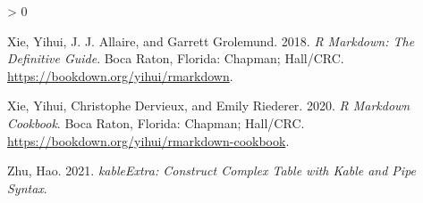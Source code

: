 \documentclass[fleqn,10pt]{wlpeerj} %
\newlength{\cslhangindent}
\newenvironment{CSLReferences}[2] %
 {%
  \setlength{\parindent}{0pt}
  \ifodd #1 \everypar{\setlength{\hangindent}{\cslhangindent}}\ignorespaces\fi
  \ifnum #2 > 0
  \setlength{\parskip}{#2\baselineskip}
  \fi
 }%
 {}
\begin{document}
\begin{CSLReferences}{1}{0}
\leavevmode\hypertarget{ref-rmarkdown2018}{}%
Xie, Yihui, J. J. Allaire, and Garrett Grolemund. 2018. \emph{R Markdown: The Definitive Guide}. Boca Raton, Florida: Chapman; Hall/CRC. \url{https://bookdown.org/yihui/rmarkdown}.

\leavevmode\hypertarget{ref-rmarkdown2020}{}%
Xie, Yihui, Christophe Dervieux, and Emily Riederer. 2020. \emph{R Markdown Cookbook}. Boca Raton, Florida: Chapman; Hall/CRC. \url{https://bookdown.org/yihui/rmarkdown-cookbook}.

\leavevmode\hypertarget{ref-R-kableExtra}{}%
Zhu, Hao. 2021. \emph{kableExtra: Construct Complex Table with Kable and Pipe Syntax}.

\end{CSLReferences}
\end{document}

